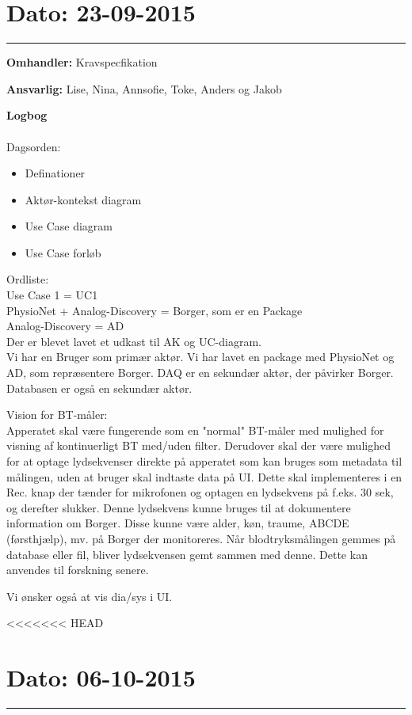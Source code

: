 \section{Dato: 23-09-2015 }
\hrule

\textbf{Omhandler:} Kravspecfikation 

\textbf{Ansvarlig:} Lise, Nina, Annsofie, Toke, Anders og Jakob

\textbf{Logbog}
\\
\\
Dagsorden:
\begin{itemize}
	\item Definationer
	\item Aktør-kontekst diagram
	\item Use Case diagram
	\item Use Case forløb
\end{itemize}

Ordliste:\\ 
Use Case 1 = UC1 \\
PhysioNet + Analog-Discovery = Borger, som er en Package \\
Analog-Discovery = AD \\


Der er blevet lavet et udkast til AK og UC-diagram. \\
Vi har en Bruger som primær aktør. Vi har lavet en package med PhysioNet og AD, som repræsentere Borger. DAQ er en sekundær aktør, der påvirker Borger. Databasen er også en sekundær aktør. 


Vision for BT-måler:\\
Apperatet skal være fungerende som en "normal" BT-måler med mulighed for visning af kontinuerligt BT med/uden filter. Derudover skal der være mulighed for at optage lydsekvenser direkte på apperatet som kan bruges som metadata til målingen, uden at bruger skal indtaste data på UI. Dette skal implementeres i en Rec. knap der tænder for mikrofonen og optagen en lydsekvens på f.eks. 30 sek, og derefter slukker. Denne lydsekvens kunne bruges til at dokumentere information om Borger. Disse kunne være alder, køn, traume, ABCDE (førsthjælp), mv. på Borger der monitoreres. 
Når blodtryksmålingen gemmes på database eller fil, bliver lydsekvensen gemt sammen med denne. Dette kan anvendes til forskning senere. 


Vi ønsker også at vis dia/sys i UI. 


<<<<<<< HEAD
\section{Dato: 06-10-2015 }
\hrule

